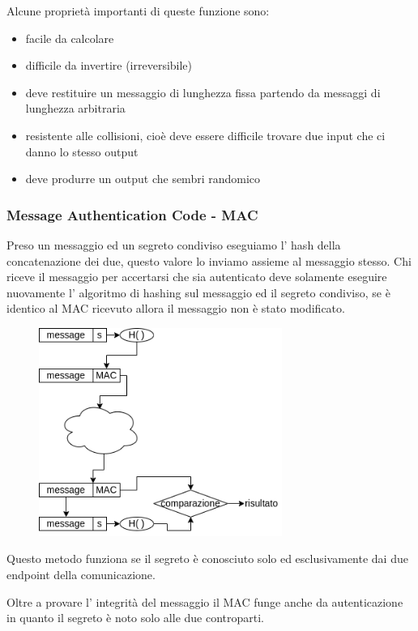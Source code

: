 Alcune proprietà importanti di queste funzione sono:
\begin{itemize}
    \item facile da calcolare
    \item difficile da invertire (irreversibile)
    \item deve restituire un messaggio di lunghezza fissa partendo da messaggi di lunghezza arbitraria
    \item resistente alle collisioni, cioè deve essere difficile trovare due input che ci danno lo stesso output
    \item deve produrre un output che sembri randomico
\end{itemize}

\subsubsection{Message Authentication Code - MAC}
Preso un messaggio ed un segreto condiviso eseguiamo l' hash della concatenazione dei due, questo valore lo inviamo assieme al messaggio stesso.
Chi riceve il messaggio per accertarsi che sia autenticato deve solamente eseguire nuovamente l' algoritmo di hashing sul messaggio ed il segreto condiviso, se è identico al MAC ricevuto allora il messaggio non è stato modificato.

\begin{figure}[H]
    \centering
    \includegraphics[width=300px]{images/7_Security/Message_authentication_code.png}
\end{figure}

Questo metodo funziona se il segreto è conosciuto solo ed esclusivamente dai due endpoint della comunicazione.

Oltre a provare l' integrità del messaggio il MAC funge anche da autenticazione in quanto il segreto è noto solo alle due controparti.

